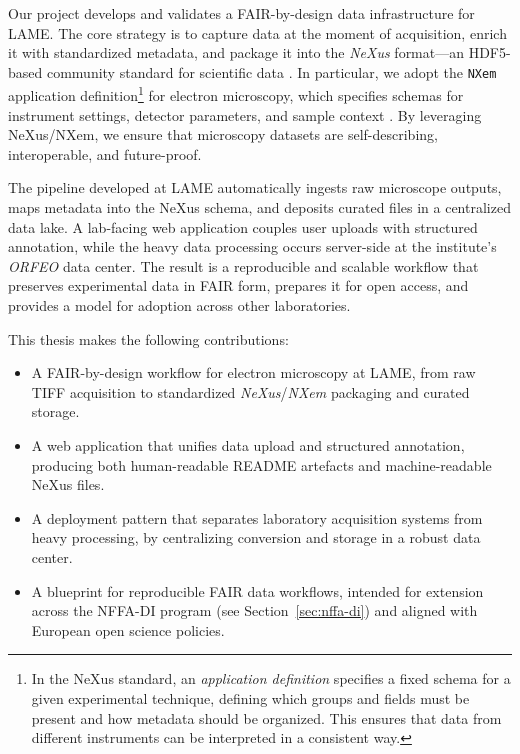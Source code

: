 Our project develops and validates a FAIR-by-design data infrastructure for LAME. 
The core strategy is to capture data at the moment of acquisition, enrich it with standardized metadata, and package it into the \textit{NeXus} format—an HDF5-based community standard for scientific data \parencite{Konnecke2015NeXus}. 
In particular, we adopt the \texttt{NXem} application definition\footnote{%
	In the NeXus standard, an \emph{application definition} specifies a fixed schema for a given experimental technique, defining which groups and fields must be present and how metadata should be organized. This ensures that data from different instruments can be interpreted in a consistent way.} 
for electron microscopy, which specifies schemas for instrument settings, detector parameters, and sample context \parencite{NXemManual,NXemFAIRmat}. 
By leveraging NeXus/NXem, we ensure that microscopy datasets are self-describing, interoperable, and future-proof.

The pipeline developed at LAME automatically ingests raw microscope outputs, maps metadata into the NeXus schema, and deposits curated files in a centralized data lake. 
A lab-facing web application couples user uploads with structured annotation, while the heavy data processing occurs server-side at the institute’s \textit{ORFEO} data center. 
The result is a reproducible and scalable workflow that preserves experimental data in FAIR form, prepares it for open access, and provides a model for adoption across other laboratories.

\medskip
\noindent This thesis makes the following contributions:
\begin{itemize}
	\item A FAIR-by-design workflow for electron microscopy at LAME, from raw TIFF acquisition to standardized \textit{NeXus}/\textit{NXem} packaging and curated storage.
	\item A web application that unifies data upload and structured annotation, producing both human-readable README artefacts and machine-readable NeXus files.
	\item A deployment pattern that separates laboratory acquisition systems from heavy processing, by centralizing conversion and storage in a robust data center.
	\item A blueprint for reproducible FAIR data workflows, intended for extension across the NFFA-DI program (see Section~\ref{sec:nffa-di}) and aligned with European open science policies.

\end{itemize}

